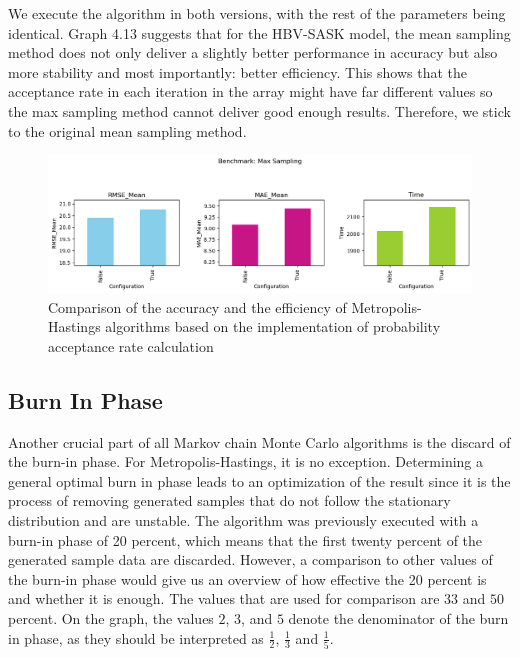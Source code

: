 We execute the algorithm in both versions, with the rest of the parameters being identical. Graph 4.13 suggests that for the HBV-SASK model, the mean sampling method does not only deliver a slightly better performance in accuracy but also more stability and most importantly: better efficiency. This shows that the acceptance rate in each iteration in the array might have far different values so the max sampling method cannot deliver good enough results. Therefore, we stick to the original mean sampling method.


\begin{figure}[H]
    \centering
    \includegraphics[width=1\textwidth]{figures/basic_mh/benchmark/max_sampling.png}
    \captionsetup{width=.8\textwidth}
    \caption{Comparison of the accuracy and the efficiency of Metropolis-Hastings algorithms based on the implementation of probability acceptance rate calculation}
    \label{fig:enter-label}
\end{figure}



\subsection{Burn In Phase}
Another crucial part of all Markov chain Monte Carlo algorithms is the discard of the burn-in phase. For Metropolis-Hastings, it is no exception. Determining a general optimal burn in phase leads to an optimization of the result since it is the process of removing generated samples that do not follow the stationary distribution and are unstable. The algorithm was previously executed with a burn-in phase of 20 percent, which means that the first twenty percent of the generated sample data are discarded. However, a comparison to other values of the burn-in phase would give us an overview of how effective the 20 percent is and whether it is enough. The values that are used for comparison are $33$ and $50$ percent. On the graph, the values $2$, $3$, and $5$ denote the denominator of the burn in phase, as they should be interpreted as $\frac 1 2$, $\frac 1 3$ and $\frac 1 5$.

